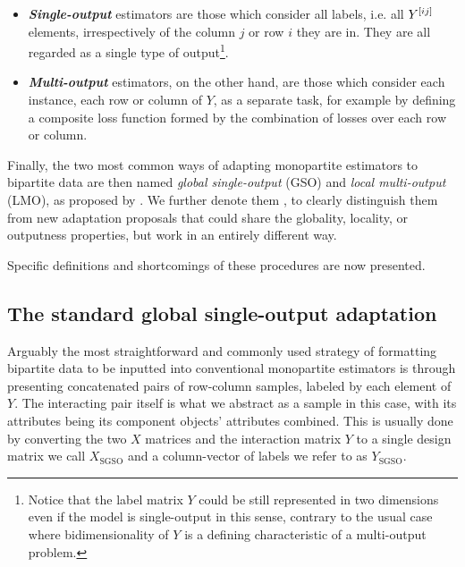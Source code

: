 \begin{itemize}
    \item \emph{\textbf{Single-output}} estimators are those which consider all labels, i.e. all $Y^{[ij]}$ elements, irrespectively of the column $j$ or row $i$ they are in. They are all regarded as a single type of output\footnote{Notice that the label matrix $Y$ could be still represented in two dimensions even if the model is single-output in this sense, contrary to the usual case where bidimensionality of $Y$ is a defining characteristic of a multi-output problem.}.
    \item \emph{\textbf{Multi-output}} estimators, on the other hand, are those which consider each instance, each row or column of $Y$, as a separate task, for example by defining a composite loss function formed by the combination of losses over each row or column.
\end{itemize}

Finally, the two most common ways of adapting monopartite estimators to bipartite data are then named \emph{global single-output} (GSO) and \emph{local multi-output} (LMO), as proposed by \textcite{pliakos2018,pliakos2019,pliakos2020}. We further denote them , to clearly distinguish them from new adaptation proposals that could share the globality, locality, or outputness properties, but work in an entirely different way.

Specific definitions and shortcomings of these procedures are now presented.


\subsection{The standard global single-output adaptation}
\label{sec:sgso}
Arguably the most straightforward and commonly used strategy of formatting bipartite data to be inputted into conventional monopartite estimators is through presenting concatenated pairs of row-column samples, labeled by each element of $Y$.
%
The interacting pair itself is what we abstract as a sample
in this case, with its attributes being its component objects' attributes
combined. This is usually done by converting the two $X$ matrices and the
interaction matrix $Y$ to a single design matrix we call $X_\text{SGSO}$ and a column-vector
 of labels we refer to as $Y_\text{SGSO}$.

